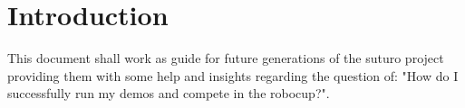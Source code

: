 \documentclass[main.tex]{subfiles}
\begin{document}
	\chapter{Introduction}
	
	This document shall work as guide for future generations of the suturo project providing them with some help and insights regarding the question of: "How do I successfully run my demos and compete in the robocup?".
\end{document}
